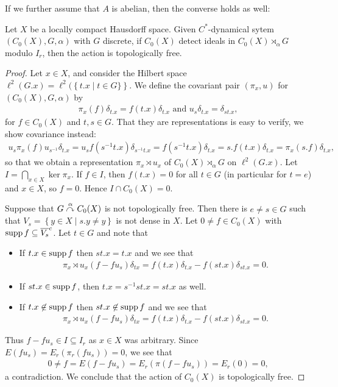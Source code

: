 If we further assume that $A$ is abelian, then the converse holds as well:
\begin{theorem}
	Let $X$ be a locally compact Hausdorff space. Given $C^*$-dynamical sytem $(C_0(X),G,\alpha)$ with $G$ discrete, if $C_0(X)$ detect ideals in $C_0(X) \rtimes_{\alpha}G$ modulo $I_r$, then the action is topologically free.
	\label{ASthm2}
\end{theorem}
\begin{proof}
	Let $x \in X$, and consider the Hilbert space $\ell^2(G.x) = \ell^2(\left\{ t.x \mid t \in G\} \right\}$. We define the covariant pair $(\pi_x,u)$ for $(C_0(X),G,\alpha)$ by
	\begin{align*}
		\pi_x(f) \delta_{t.x} = f(t.x) \delta_{t.x} \text{ and } u_s \delta_{t.x} = \delta_{st.x},
	\end{align*}
	for $f \in C_0(X)$ and $t,s \in G$. That they are representations is easy to verify, we show covariance instead:
	\begin{align*}
		u_s \pi_x(f) u_{s^{-1}} \delta_{t.x} = u_{s} f(s^{-1}t.x)\delta_{s^{-1}t.x} = f(s^{-1}t.x) \delta_{t.x} = s.f(t.x)\delta_{t.x} = \pi_x(s.f)\delta_{t.x},
	\end{align*}
	so that we obtain a representation $\pi_x \rtimes u_x$ of $C_0(X) \rtimes_\alpha G$ on $\ell^2(G.x)$. Let $I = \bigcap_{x \in  X} \ker \pi_{x}$. If $f \in I$, then $f(t.x) = 0$ for all $t \in G$ (in particular for $t=e$) and $x \in  X$, so $f = 0$. Hence $I \cap C_0(X) = 0$.
	
	Suppose that $G \stackrel{\alpha}{\curvearrowright} C_0(X)$ is not topologically free. Then there is $e \neq s \in G$ such that $V_s=\left\{ y \in X  \mid s.y \neq y \right\}$ is not dense in $X$. Let $0 \neq f \in C_0(X)$ with $\operatorname{supp} f \subseteq \overline{V_s}^c$. Let $t \in G$ and note that
	\begin{itemize}[nosep]
	\item If $t.x \in \operatorname{supp} f$ then $st.x = t.x$ and we see that
	\begin{align*}
		\pi_x\rtimes u_x(f-fu_s)\delta_{tx} = f(t.x) \delta_{t.x} - f(st.x)\delta_{st.x}= 0.
	\end{align*}
	\item If $st.x  \in \operatorname{supp} f$, then $t.x = s^{-1}st.x = st.x$ as well.
	\item If $t.x \not \in \operatorname{supp} f$ then $st.x \not \in \operatorname{supp} f$ and we see that
	\begin{align*}
		\pi_x\rtimes u_x(f-fu_s)\delta_{tx} = f(t.x) \delta_{t.x} - f(st.x)\delta_{st.x}= 0.
	\end{align*}
\end{itemize}
	 Thus $f-f u_s \in I \subseteq I_r$ as $x \in X$ was arbitrary. Since $E(f u_s) = E_r(\pi_r(fu_s)) =0$, we see that 
	\begin{align*}
		0 \neq f = E(f-fu_s) = E_r (\pi(f-fu_s))= E_r(0) =0,
	\end{align*}
	a contradiction. We conclude that the action of $C_0(X)$ is topologically free.
\end{proof}
